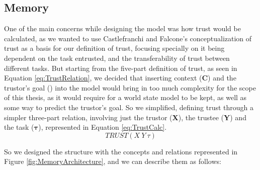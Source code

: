 \subsection{Memory}
One of the main concerns while designing the model was how trust would be calculated, as we wanted to use Castlefranchi and Falcone's conceptualization of trust \cite{Castelfranchi2010} as a basis for our definition of trust, focusing specially on it being dependent on the task entrusted, and the transferability of trust between different tasks. But starting from the five-part definition of trust, as seen in Equation \ref{eq:TrustRelation}, we decided that inserting context (\textbf{C}) and the trustor's goal () into the model would bring in too much complexity for the scope of this thesis, as it would require for a world state model to be kept, as well as some way to predict the trustor's goal. So we simplified, defining trust through a simpler three-part relation, involving just the trustor (\textbf{X}), the trustee (\textbf{Y}) and the task ($\bm{\tau}$), represented in Equation \ref{eq:TrustCalc}.
\begin{equation}
TRUST(X\ Y\ \tau)
\label{eq:TrustCalc}
\end{equation}

So we designed the structure with the concepts and relations represented in Figure \ref{fig:MemoryArchitecture}, and we can describe them as follows:

